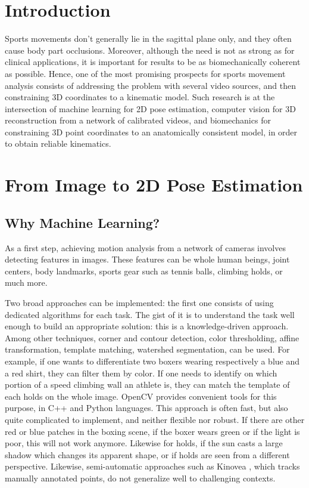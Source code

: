 \minitoc
\newpage

\section{Introduction}

Sports movements don’t generally lie in the sagittal plane only, and they often cause body part occlusions. Moreover, although the need is not as strong as for clinical applications, it is important for results to be as biomechanically coherent as possible. Hence, one of the most promising prospects for sports movement analysis consists of addressing the problem with several video sources, and then constraining 3D coordinates to a kinematic model.  Such research is at the intersection of machine learning for 2D pose estimation, computer vision for 3D reconstruction from a network of calibrated videos, and biomechanics for constraining 3D point coordinates to an anatomically consistent model, in order to obtain reliable kinematics. 


\section{From Image to 2D Pose Estimation}

\subsection{Why Machine Learning?}

As a first step, achieving motion analysis from a network of cameras involves detecting features in images. These features can be whole human beings, joint centers, body landmarks, sports gear such as tennis balls, climbing holds, or much more. 

Two broad approaches can be implemented: the first one consists of using dedicated algorithms for each task. The gist of it is to understand the task well enough to build an appropriate solution: this is a knowledge-driven approach. Among other techniques, corner and contour detection, color thresholding, affine transformation, template matching, watershed segmentation, can be used. For example, if one wants to differentiate two boxers wearing respectively a blue and a red shirt, they can filter them by color. If one needs to identify on which portion of a speed climbing wall an athlete is, they can match the template of each holds on the whole image. OpenCV \cite{Bradski2000} provides convenient tools for this purpose, in C++ and Python languages. This approach is often fast, but also quite complicated to implement, and neither flexible nor robust. If there are other red or blue patches in the boxing scene, if the boxer wears green or if the light is poor, this will not work anymore. Likewise for holds, if the sun casts a large shadow which changes its apparent shape, or if holds are seen from a different perspective. Likewise, semi-automatic approaches such as Kinovea \cite{Kinovea}, which tracks manually annotated points, do not generalize well to challenging contexts.

